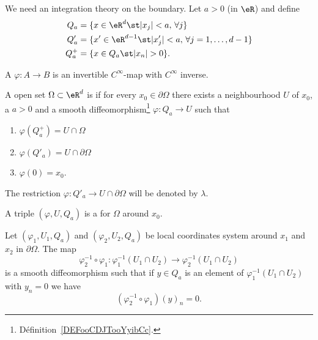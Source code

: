 We need an integration theory on the boundary. Let \( a>0\) (in \( \eR\)) and define
\begin{subequations}
	\begin{align}
		Q_a   & =\{ x\in \eR^{d}\st | x_j |<a,\,\forall j \}                   \\
		Q'_a  & =\{ x'\in \eR^{d-1}\st | x'_j |<a,\,\forall j=1,\ldots, d-1 \} \\
		Q^+_a & =\{ x\in Q_a\st | x_n |>0\}.
	\end{align}
\end{subequations}

\begin{definition}          \label{DEFooCDJTooYyibCc}
	A  \( \varphi\colon A\to B\) is an invertible \(  C^{\infty}\)-map with \(  C^{\infty}\) inverse.
\end{definition}

\begin{definition}
	A open set \( \Omega\subset \eR^d\) is  if for every \( x_0\in \partial\Omega\) there exists a neighbourhood \( U\) of \( x_0\), a \( a>0\) and a smooth diffeomorphism\footnote{Définition~\ref{DEFooCDJTooYyibCc}.} \( \varphi\colon Q_a\to U\) such that
	\begin{enumerate}
		\item
		      \( \varphi(Q_a^+)=U\cap\Omega\)
		\item
		      \( \varphi(Q'_a)=U\cap\partial\Omega\)
		\item
		      \( \varphi(0)=x_0\).
	\end{enumerate}
\end{definition}
The restriction \( \varphi\colon Q'_a\to U\cap\partial\Omega\) will be denoted by \( \lambda\).

\begin{definition}
	A triple \( (\varphi,U,Q_a)\) is a  for \( \Omega\) around \( x_0\).
\end{definition}

\begin{lemma}
	Let \( (\varphi_1,U_1,Q_a)\) and \( (\varphi_2,U_2,Q_a)\) be local coordinates system around \( x_1\) and \( x_2\) in \( \partial\Omega\). The map
	\begin{equation}
		\varphi_2^{-1}\circ\varphi_1\colon \varphi_1^{-1}(U_1\cap U_2)\to \varphi_2^{-1}(U_1\cap U_2)
	\end{equation}
	is a smooth diffeomorphism such that if \( y\in Q_a\) is an element of \( \varphi_1^{-1}(U_1\cap U_2)\) with \( y_n=0\) we have
	\begin{equation}
		(\varphi_2^{-1}\circ\varphi_1)(y)_n=0.
	\end{equation}
\end{lemma}

